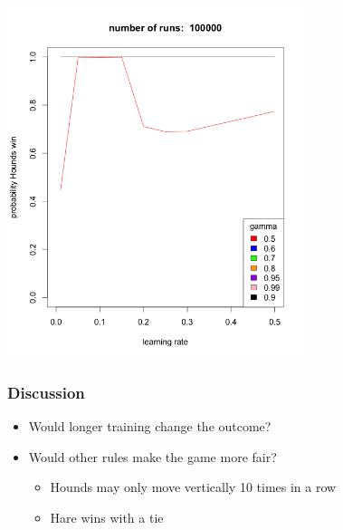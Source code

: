 \documentclass{beamer}
\begin{document}
\begin{frame}
    \centering
    \includegraphics[width=0.65\textwidth]{r100000.png}
\end{frame}


\begin{frame}
	\frametitle{Discussion}
	\begin{itemize}
		\item Would longer training change the outcome?
		\item Would other rules make the game more fair?
		\begin{itemize}[<+->]
        		\item<2-> Hounds may only move vertically 10 times in a row
	 		\item<3-> Hare wins with a tie
		\end{itemize}
	\end{itemize}
\end{frame}
\end{document}
